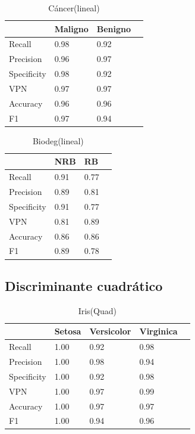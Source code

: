 \documentclass[a4paper,openwrite,12pt]{article}
\begin{document}
\begin{table}[H]
\centering
\begin{tabular}{@{}llll@{}}
\toprule
            & Maligno & Benigno &  \\ \midrule
Recall      & 0.98    & 0.92    &  \\
Precision   & 0.96    & 0.97    &  \\
Specificity & 0.98    & 0.92    &  \\
VPN         & 0.97    & 0.97    &  \\
Accuracy    & 0.96    & 0.96    &  \\
F1          & 0.97    & 0.94    &  \\ \bottomrule
\end{tabular}
\caption{Cáncer(lineal)}
\end{table}


\begin{table}[H]
\centering
\begin{tabular}{@{}llll@{}}
\toprule
            & NRB &   RB &  \\ \midrule
Recall      & 0.91    & 0.77    &  \\
Precision   & 0.89    & 0.81    &  \\
Specificity & 0.91    & 0.77    &  \\
VPN         & 0.81    & 0.89    &  \\
Accuracy    & 0.86    & 0.86    &  \\
F1          & 0.89    & 0.78    &  \\ \bottomrule
\end{tabular}
\caption{Biodeg(lineal)}
\end{table}



\subsection{Discriminante cuadrático}


\begin{table}[H]
\centering
\begin{tabular}{@{}lllll@{}}
\toprule
            & Setosa & Versicolor & Virginica &  \\ \midrule
Recall      & 1.00   & 0.92       & 0.98      &  \\
Precision   & 1.00   & 0.98       & 0.94      &  \\
Specificity & 1.00   & 0.92       & 0.98      &  \\
VPN         & 1.00   & 0.97       & 0.99      &  \\
Accuracy    & 1.00   & 0.97       & 0.97      &  \\
F1          & 1.00   & 0.94       & 0.96      &  \\ \bottomrule
\end{tabular}
\caption{Iris(Quad)}
\end{table}
\end{document}
